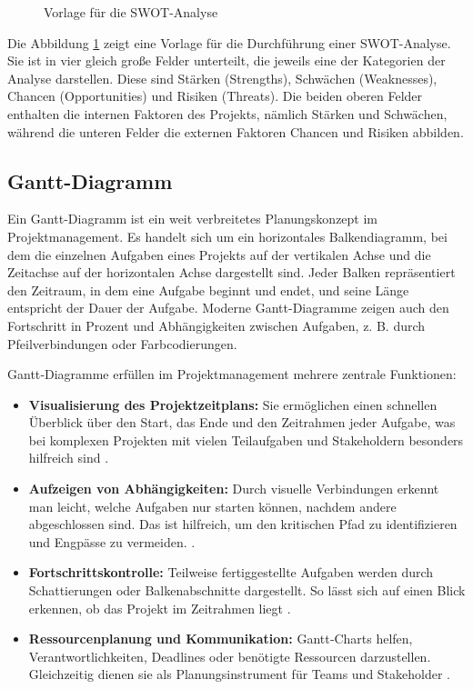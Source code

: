 \vspace{0.6cm}
\begin{figure}[hbt]
	\centering
	
	\vspace{1cm}
	\caption{Vorlage für die SWOT-Analyse}		
	\label{fig:SWOTexample}
\end{figure}

Die Abbildung \ref{fig:SWOTexample} zeigt eine Vorlage für die Durchführung einer SWOT-Analyse. Sie ist in vier gleich große Felder unterteilt, die jeweils eine der Kategorien der Analyse darstellen. Diese sind Stärken (Strengths), Schwächen (Weaknesses), Chancen (Opportunities) und Risiken (Threats). Die beiden oberen Felder enthalten die internen Faktoren des Projekts, nämlich Stärken und Schwächen, während die unteren Felder die externen Faktoren Chancen und Risiken abbilden.


\subsection{Gantt-Diagramm}
\label{cha:Gantt-Diagramm}

Ein Gantt-Diagramm ist ein weit verbreitetes Planungskonzept im Projektmanagement. Es handelt sich um ein horizontales Balkendiagramm, bei dem die einzelnen Aufgaben eines Projekts auf der vertikalen Achse und die Zeitachse auf der horizontalen Achse dargestellt sind. Jeder Balken repräsentiert den Zeitraum, in dem eine Aufgabe beginnt und endet, und seine Länge entspricht der Dauer der Aufgabe. Moderne Gantt-Diagramme zeigen auch den Fortschritt in Prozent und Abhängigkeiten zwischen Aufgaben, z. B. durch Pfeilverbindungen oder Farbcodierungen. \cite{Gantt.2024}

Gantt‑Diagramme erfüllen im Projektmanagement mehrere zentrale Funktionen:

\begin{itemize}
	\item \textbf{Visualisierung des Projektzeitplans:} Sie ermöglichen einen schnellen Überblick über den Start, das Ende und den Zeitrahmen jeder Aufgabe, was bei komplexen Projekten mit vielen Teilaufgaben und Stakeholdern besonders hilfreich sind \autocite{APM.2024}.
	\item \textbf{Aufzeigen von Abhängigkeiten:} Durch visuelle Verbindungen erkennt man leicht, welche Aufgaben nur starten können, nachdem andere abgeschlossen sind. Das ist hilfreich, um den kritischen Pfad zu identifizieren und Engpässe zu vermeiden. \autocite{APM.2024}.
	\item \textbf{Fortschrittskontrolle:} Teilweise fertiggestellte Aufgaben werden durch Schattierungen oder Balkenabschnitte dargestellt. So lässt sich auf einen Blick erkennen, ob das Projekt im Zeitrahmen liegt \autocite{Gantt.2024}.
	\item \textbf{Ressourcenplanung und Kommunikation:} Gantt‑Charts helfen, Verantwortlichkeiten, Deadlines oder benötigte Ressourcen darzustellen. Gleichzeitig dienen sie als Planungsinstrument für Teams und Stakeholder \autocite{Wadhwa.2024}.
\end{itemize}

